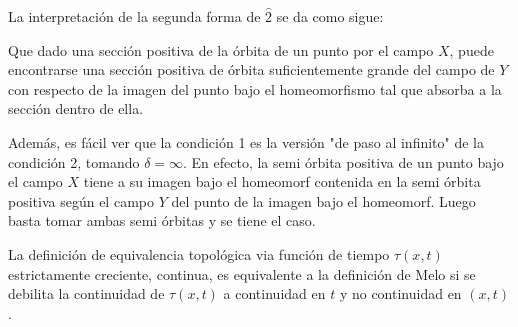\begin{rmrk}
	La interpretación de la segunda forma de $\hat{2}$ se da como sigue:
	
	Que dado una sección positiva de la órbita de un punto por el campo $X$, puede encontrarse una sección positiva de órbita suficientemente grande del campo de $Y$ con respecto de la imagen del punto bajo el homeomorfismo tal que absorba a la sección dentro de ella.
	
	Además, es fácil ver que la condición 1 es la versión "de paso al infinito" de la condición 2, tomando $\delta = \infty$. En efecto, la semi órbita positiva de un punto bajo el campo $X$ tiene a su imagen bajo el homeomorf contenida en la semi órbita positiva según el campo $Y$ del punto de la imagen bajo el homeomorf. Luego basta tomar ambas semi órbitas y se tiene el caso.
\end{rmrk}


\begin{thm}
	La definición de equivalencia topológica via función de tiempo $\tau(x,t)$ estrictamente creciente, continua, es equivalente a la definición de Melo si se debilita la continuidad de $\tau(x,t)$ a continuidad en $t$ y no continuidad en $(x,t)$.
\end{thm}

